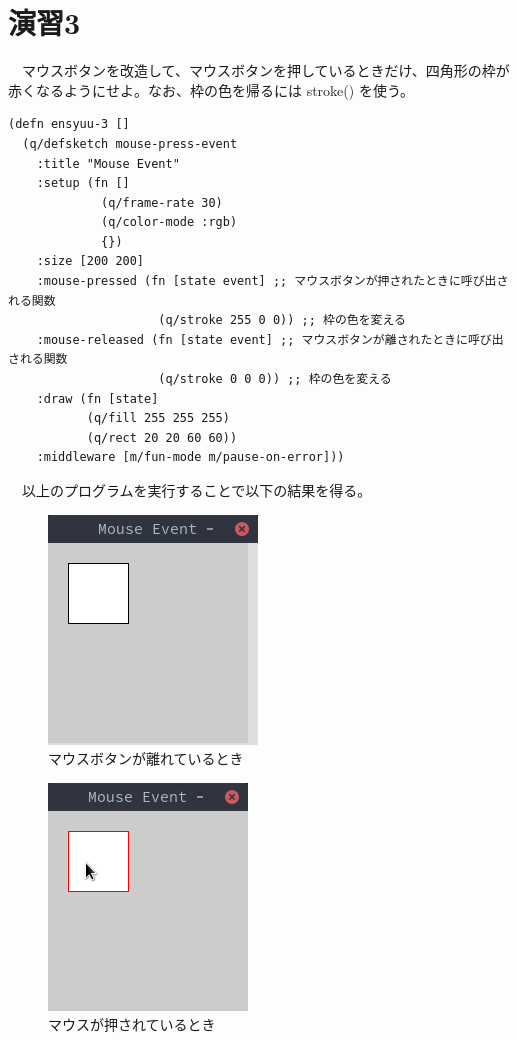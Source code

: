 \documentclass{scrartcl}
\begin{document}
\section{演習3}
\label{sec:org5d861e1}
　マウスボタンを改造して、マウスボタンを押しているときだけ、四角形の枠が赤くなるようにせよ。なお、枠の色を帰るには stroke() を使う。\\
\begin{verbatim}
(defn ensyuu-3 []
  (q/defsketch mouse-press-event
    :title "Mouse Event"
    :setup (fn []
             (q/frame-rate 30)
             (q/color-mode :rgb)
             {})
    :size [200 200]
    :mouse-pressed (fn [state event] ;; マウスボタンが押されたときに呼び出される関数
                     (q/stroke 255 0 0)) ;; 枠の色を変える
    :mouse-released (fn [state event] ;; マウスボタンが離されたときに呼び出される関数
                     (q/stroke 0 0 0)) ;; 枠の色を変える
    :draw (fn [state]
           (q/fill 255 255 255)
           (q/rect 20 20 60 60))
    :middleware [m/fun-mode m/pause-on-error]))
\end{verbatim}
　以上のプログラムを実行することで以下の結果を得る。\\
\begin{figure}[htbp]
\centering
\includegraphics[width=0.3\linewidth]{./img/ensyuu3-2.png}
\caption{マウスボタンが離れているとき}
\end{figure}

\begin{figure}[htbp]
\centering
\includegraphics[width=0.3\linewidth]{./img/ensyuu3-1.png}
\caption{マウスが押されているとき}
\end{figure}
\end{document}
